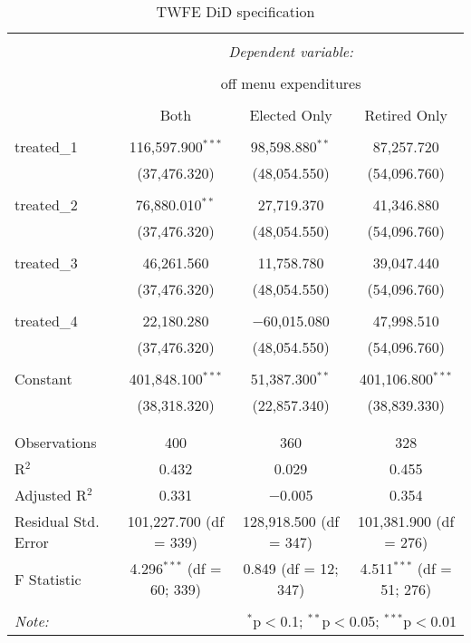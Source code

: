 \begin{table}[H] \centering 
  \caption{TWFE DiD specification} 
  \label{} 
\begin{tabular}{@{\extracolsep{5pt}}lccc} 
\\[-1.8ex]\hline 
\hline \\[-1.8ex] 
 & \multicolumn{3}{c}{\textit{Dependent variable:}} \\ 
\cline{2-4} 
\\[-1.8ex] & \multicolumn{3}{c}{off menu expenditures} \\ 
\\[-1.8ex] & Both & Elected Only & Retired Only\\ 
\hline \\[-1.8ex] 
 treated\_1 & 116,597.900$^{***}$ & 98,598.880$^{**}$ & 87,257.720 \\ 
  & (37,476.320) & (48,054.550) & (54,096.760) \\ 
  & & & \\ 
 treated\_2 & 76,880.010$^{**}$ & 27,719.370 & 41,346.880 \\ 
  & (37,476.320) & (48,054.550) & (54,096.760) \\ 
  & & & \\ 
 treated\_3 & 46,261.560 & 11,758.780 & 39,047.440 \\ 
  & (37,476.320) & (48,054.550) & (54,096.760) \\ 
  & & & \\ 
 treated\_4 & 22,180.280 & $-$60,015.080 & 47,998.510 \\ 
  & (37,476.320) & (48,054.550) & (54,096.760) \\ 
  & & & \\ 
 Constant & 401,848.100$^{***}$ & 51,387.300$^{**}$ & 401,106.800$^{***}$ \\ 
  & (38,318.320) & (22,857.340) & (38,839.330) \\ 
  & & & \\ 
\hline \\[-1.8ex] 
Observations & 400 & 360 & 328 \\ 
R$^{2}$ & 0.432 & 0.029 & 0.455 \\ 
Adjusted R$^{2}$ & 0.331 & $-$0.005 & 0.354 \\ 
Residual Std. Error & 101,227.700 (df = 339) & 128,918.500 (df = 347) & 101,381.900 (df = 276) \\ 
F Statistic & 4.296$^{***}$ (df = 60; 339) & 0.849 (df = 12; 347) & 4.511$^{***}$ (df = 51; 276) \\ 
\hline 
\hline \\[-1.8ex] 
\textit{Note:}  & \multicolumn{3}{r}{$^{*}$p$<$0.1; $^{**}$p$<$0.05; $^{***}$p$<$0.01} \\ 
\end{tabular} 
\end{table} 
